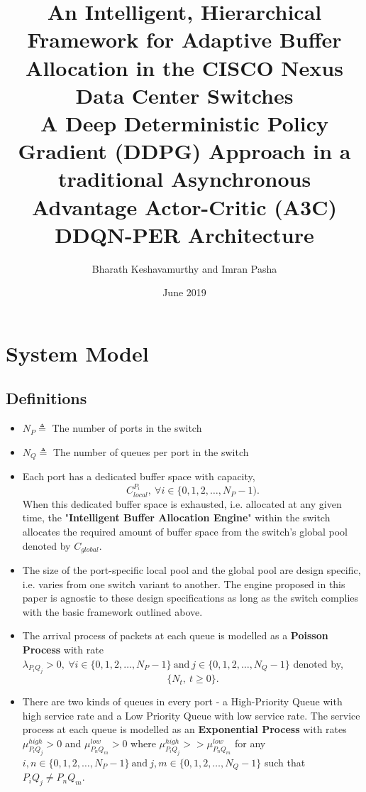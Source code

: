 \documentclass{article}
\title{%
      An Intelligent, Hierarchical Framework for Adaptive Buffer Allocation in the CISCO Nexus Data Center Switches\\
      \large A Deep Deterministic Policy Gradient (DDPG) Approach in a traditional Asynchronous Advantage Actor-Critic (A3C) DDQN-PER Architecture}
\author{Bharath Keshavamurthy and Imran Pasha}
\affil{CISCO Systems, Inc.}
\date{June 2019}
\begin{document}
\maketitle
\section{System Model}
\subsection{Definitions}
\begin{itemize}
    \item $N_P \triangleq $ The number of ports in the switch
    \item $N_Q \triangleq $ The number of queues per port in the switch
    \item Each port has a dedicated buffer space with capacity, 
    \[C_{local}^{P_i},\ \forall i \in \{0, 1, 2, \dots, N_P-1).\]
    When this dedicated buffer space is exhausted, i.e. allocated at any given time, the "\textbf{Intelligent Buffer Allocation Engine}" within the switch allocates the required amount of buffer space from the switch's global pool denoted by $C_{global}$.
    \item The size of the port-specific local pool and the global pool are design specific, i.e. varies from one switch variant to another. The engine proposed in this paper is agnostic to these design specifications as long as the switch complies with the basic framework outlined above.
    \item The arrival process of packets at each queue is modelled as a \textbf{Poisson Process} with rate $\lambda_{P_i Q_j} > 0,\ \forall i \in \{0, 1, 2, \dots, N_P-1\}\ \text{and}\ j \in \{0, 1, 2, \dots, N_Q-1\}$ denoted by,
    \[\{N_t,\ t \geq 0\}.\]
    \item There are two kinds of queues in every port - a High-Priority Queue with high service rate and a Low Priority Queue with low service rate. The service process at each queue is modelled as an \textbf{Exponential Process} with rates $\mu_{P_i Q_j}^{high} > 0$ and $\mu_{P_n Q_m}^{low} > 0$ where $\mu_{P_i Q_j}^{high} >> \mu_{P_n Q_m}^{low}$ for any $i, n \in \{0, 1, 2, \dots, N_P-1\}\ \text{and}\ j, m \in \{0, 1, 2, \dots, N_Q-1\}$ such that $P_i Q_j \neq P_n Q_m$.
\end{itemize}
\end{document}
